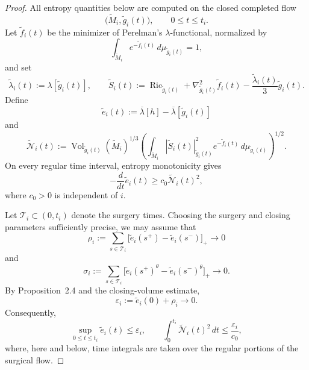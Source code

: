 \documentclass{amsart}
\begin{document}
\begin{proof}
\noindent
All entropy quantities below are computed on the closed completed flow
\[
        \bigl(\widetilde M_i,\widetilde g_i(t)\bigr),
        \qquad 0\leq t\leq t_i .
\]
Let \(\widetilde f_i(t)\) be the minimizer of Perelman's
\(\lambda\)-functional, normalized by
\[
        \int_{\widetilde M_i}
        e^{-\widetilde f_i(t)}
        \,d\mu_{\widetilde g_i(t)}
        =1,
\]
and set
\[
        \widetilde\lambda_i(t)
        :=
        \lambda[\widetilde g_i(t)],
        \qquad
        \widetilde S_i(t)
        :=
        \operatorname{Ric}_{\widetilde g_i(t)}
        +
        \nabla_{\widetilde g_i(t)}^{2}\widetilde f_i(t)
        -
        \frac{\widetilde\lambda_i(t)}{3}
        \widetilde g_i(t).
\]
Define
\[
        \widetilde e_i(t)
        :=
        \overline\lambda[h]
        -
        \overline\lambda[\widetilde g_i(t)]
\]
and
\[
        \widetilde{\mathcal N}_i(t)
        :=
        \operatorname{Vol}_{\widetilde g_i(t)}
        (\widetilde M_i)^{1/3}
        \left(
        \int_{\widetilde M_i}
        |\widetilde S_i(t)|_{\widetilde g_i(t)}^{2}
        e^{-\widetilde f_i(t)}
        \,d\mu_{\widetilde g_i(t)}
        \right)^{1/2}.
\]
On every regular time interval, entropy monotonicity gives
\begin{equation}
\label{eq:closed-entropy-dissipation}
        -\frac{d}{dt}\widetilde e_i(t)
        \geq
        c_0\widetilde{\mathcal N}_i(t)^2,
\end{equation}
where \(c_0>0\) is independent of \(i\).

\noindent Let \(\mathcal T_i\subset(0,t_i)\) denote the surgery times.  Choosing
the surgery and closing parameters sufficiently precise, we may assume
that
\[
        \rho_i
        :=
        \sum_{s\in\mathcal T_i}
        \bigl[
        \widetilde e_i(s^+)-\widetilde e_i(s^-)
        \bigr]_+
        \longrightarrow0
\]
and
\[
        \sigma_i
        :=
        \sum_{s\in\mathcal T_i}
        \bigl[
        \widetilde e_i(s^+)^\theta
        -
        \widetilde e_i(s^-)^\theta
        \bigr]_+
        \longrightarrow0.
\]
By Proposition~2.4 and the closing-volume estimate,
\[
        \varepsilon_i
        :=
        \widetilde e_i(0)+\rho_i
        \longrightarrow0.
\]
Consequently,
\begin{equation}
\label{eq:closed-entropy-budget}
        \sup_{0\leq t\leq t_i}\widetilde e_i(t)
        \leq\varepsilon_i,
        \qquad
        \int_0^{t_i}
        \widetilde{\mathcal N}_i(t)^2\,dt
        \leq
        \frac{\varepsilon_i}{c_0},
\end{equation}
where, here and below, time integrals are taken over the regular
portions of the surgical flow.


\end{proof}
\end{document}
